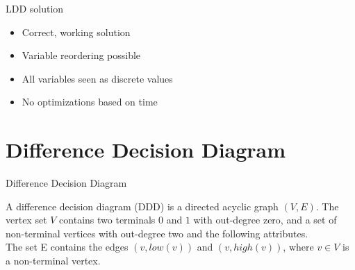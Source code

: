 \begin{frame}{LDD solution}
\begin{itemize}
	\item Correct, working solution
	\item Variable reordering possible
	\item All variables seen as discrete values
	\item No optimizations based on time
\end{itemize}
\end{frame}

\section{Difference Decision Diagram}

\begin{frame}{Difference Decision Diagram}
\begin{mydef}
A difference decision diagram (DDD) is a directed acyclic graph $(V,E)$. The vertex set $V$ contains two terminals $0$ and $1$ with out-degree zero, and a set of non-terminal vertices with out-degree two and the following attributes.
\\
The set E contains the edges $(v,low(v))$ and $(v, high(v))$, where $v \in V$ is a non-terminal vertex.
\end{mydef}
\end{frame}

